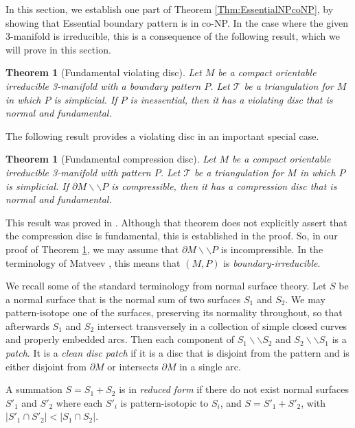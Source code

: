 \documentclass[oneside]{amsart}
\numberwithin{equation}{section}
\theoremstyle{plain}
\newtheorem{theorem}[equation]{Theorem}
\theoremstyle{definition}
\newcommand{\cut}{\backslash\backslash}
\begin{document}
In this section, we establish one part of Theorem \ref{Thm:EssentialNPcoNP}, by showing that 
{\sc Essential boundary pattern} is in co-NP. In the case where the given 3-manifold is irreducible,
this is a consequence of the following result, which we will prove in this section.

\begin{theorem}[Fundamental violating disc]
\label{Thm:ViolatingFundamental}
Let $M$ be a compact orientable irreducible 3-manifold with a boundary pattern $P$. Let $\mathcal{T}$
be a triangulation for $M$ in which $P$ is simplicial. If $P$ is inessential, then it has a violating
disc that is normal and fundamental.
\end{theorem}

The following result provides a violating disc in an important special case.

\begin{theorem}[Fundamental compression disc]
\label{Thm:CompressionDiscFund}
Let $M$ be a compact orientable irreducible 3-manifold with pattern $P$. Let $\mathcal{T}$ be
a triangulation for $M$ in which $P$ is simplicial. If $\partial M \cut P$ is 
compressible, then it has a compression disc that is normal and fundamental.
\end{theorem}

This result was proved in \cite[Theorem 4.1.13]{Matveev}. Although that theorem does not
explicitly assert that the compression disc is fundamental, this is established in the proof.
So, in our proof of Theorem \ref{Thm:ViolatingFundamental}, we may assume that $\partial M \cut P$
is incompressible. In the terminology of Matveev \cite{Matveev}, this means that $(M,P)$ is 
\emph{boundary-irreducible}. 

We recall some of the standard terminology from normal surface theory. Let $S$ be a normal surface
that is the normal sum of two surfaces $S_1$ and $S_2$. We may pattern-isotope one of the surfaces, preserving
its normality throughout, so that afterwards $S_1$ and $S_2$ intersect transversely in a collection of simple closed curves and properly embedded
arcs. Then each component of $S_1 \cut S_2$ and $S_2 \cut S_1$ is a \emph{patch}. It is 
a \emph{clean disc patch} if it is a disc that is disjoint from the pattern and is either disjoint from $\partial M$
or intersects $\partial M$ in a single arc.

A summation $S = S_1 + S_2$ is in \emph{reduced form} if there do not exist normal surfaces $S'_1$ and $S'_2$
where each $S'_i$ is pattern-isotopic to $S_i$, and $S = S'_1 + S'_2$, with $|S'_1 \cap S'_2| < |S_1 \cap S_2|$.
\end{document}

